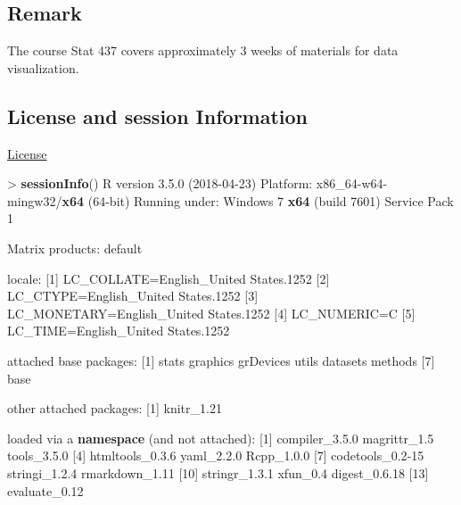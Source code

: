 \documentclass[]{article}
\newenvironment{Shaded}{\begin{snugshade}}{\end{snugshade}}
\newcommand{\KeywordTok}[1]{\textcolor[rgb]{0.13,0.29,0.53}{\textbf{{#1}}}}
\newcommand{\DecValTok}[1]{\textcolor[rgb]{0.00,0.00,0.81}{{#1}}}
\newcommand{\FloatTok}[1]{\textcolor[rgb]{0.00,0.00,0.81}{{#1}}}
\newcommand{\StringTok}[1]{\textcolor[rgb]{0.31,0.60,0.02}{{#1}}}
\newcommand{\NormalTok}[1]{{#1}}
\begin{document}
\subsection{Remark}\label{remark}

The course Stat 437 covers approximately 3 weeks of materials for data
visualization.

\subsection{License and session
Information}\label{license-and-session-information}

\href{http://math.wsu.edu/faculty/xchen/stat412/LICENSE.html}{License}

\begin{Shaded}
\begin{Highlighting}[]
\NormalTok{>}\StringTok{ }\KeywordTok{sessionInfo}\NormalTok{()}
\NormalTok{R version }\FloatTok{3.5.0} \NormalTok{(}\DecValTok{2018-04-23}\NormalTok{)}
\NormalTok{Platform:}\StringTok{ }\NormalTok{x86_64-w64-mingw32/}\KeywordTok{x64} \NormalTok{(}\DecValTok{64}\NormalTok{-bit)}
\NormalTok{Running under:}\StringTok{ }\NormalTok{Windows }\DecValTok{7} \KeywordTok{x64} \NormalTok{(build }\DecValTok{7601}\NormalTok{) Service Pack }\DecValTok{1}

\NormalTok{Matrix products:}\StringTok{ }\NormalTok{default}

\NormalTok{locale:}
\NormalTok{[}\DecValTok{1}\NormalTok{] LC_COLLATE=English_United States}\FloatTok{.1252} 
\NormalTok{[}\DecValTok{2}\NormalTok{] LC_CTYPE=English_United States}\FloatTok{.1252}   
\NormalTok{[}\DecValTok{3}\NormalTok{] LC_MONETARY=English_United States}\FloatTok{.1252}
\NormalTok{[}\DecValTok{4}\NormalTok{] LC_NUMERIC=C                          }
\NormalTok{[}\DecValTok{5}\NormalTok{] LC_TIME=English_United States}\FloatTok{.1252}    

\NormalTok{attached base packages:}
\NormalTok{[}\DecValTok{1}\NormalTok{] stats     graphics  grDevices utils     datasets  methods  }
\NormalTok{[}\DecValTok{7}\NormalTok{] base     }

\NormalTok{other attached packages:}
\NormalTok{[}\DecValTok{1}\NormalTok{] knitr_1}\FloatTok{.21}

\NormalTok{loaded via a }\KeywordTok{namespace} \NormalTok{(and not attached):}
\StringTok{ }\NormalTok{[}\DecValTok{1}\NormalTok{] compiler_3}\FloatTok{.5.0}   \NormalTok{magrittr_1}\FloatTok{.5}     \NormalTok{tools_3}\FloatTok{.5.0}     
 \NormalTok{[}\DecValTok{4}\NormalTok{] htmltools_0}\FloatTok{.3.6}  \NormalTok{yaml_2}\FloatTok{.2.0}       \NormalTok{Rcpp_1}\FloatTok{.0.0}      
 \NormalTok{[}\DecValTok{7}\NormalTok{] codetools_0}\FloatTok{.2}\DecValTok{-15} \NormalTok{stringi_1}\FloatTok{.2.4}    \NormalTok{rmarkdown_1}\FloatTok{.11}  
\NormalTok{[}\DecValTok{10}\NormalTok{] stringr_1}\FloatTok{.3.1}    \NormalTok{xfun_0}\FloatTok{.4}         \NormalTok{digest_0}\FloatTok{.6.18}   
\NormalTok{[}\DecValTok{13}\NormalTok{] evaluate_0}\FloatTok{.12}   
\end{Highlighting}
\end{Shaded}
\end{document}
